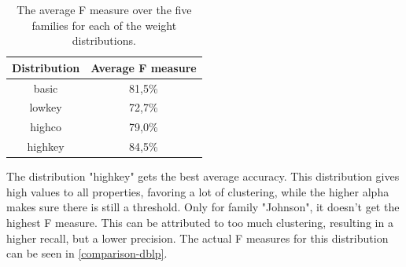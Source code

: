\begin{table}[ht]
	\center
	\begin{tabular}{|c|c|}
		\hline
		\bfseries{Distribution} & \bfseries{Average F measure} \\
		\hline
		basic & 81,5\% \\
		\hline
		lowkey & 72,7\% \\
		\hline
		highco & 79,0\% \\
		\hline
		highkey & 84,5\% \\
		\hline
	\end{tabular}
	\caption{The average F measure over the five families for each of the weight distributions.}
	\label{table:avg-f-distr}
\end{table}

The distribution "highkey" gets the best average accuracy. This distribution gives high values to all properties, favoring a lot of clustering, while the higher alpha makes sure there is still a threshold. Only for family "Johnson", it doesn't get the highest F measure. This can be attributed to too much clustering, resulting in a higher recall, but a lower precision. The actual F measures for this distribution can be seen in \autoref{comparison-dblp}.

